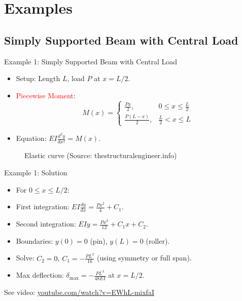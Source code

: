\documentclass{beamer}
\begin{document}
\section{Examples}
\subsection{Simply Supported Beam with Central Load}
\begin{frame}{Example 1: Simply Supported Beam with Central Load}
    \begin{itemize}
        \item Setup: Length \( L \), load \( P \) at \( x = L/2 \).
        \item \textcolor{red}{Piecewise Moment}:
        \[
        M(x) = \begin{cases} 
        \frac{Px}{2}, & 0 \leq x \leq \frac{L}{2} \\
        \frac{P(L-x)}{2}, & \frac{L}{2} < x \leq L 
        \end{cases}
        \]
        \item Equation: \( EI \frac{d^2y}{dx^2} = M(x) \).
    \end{itemize}
    \begin{figure}
        \centering
        \caption{Elastic curve (Source: thestructuralengineer.info)}
    \end{figure}
\end{frame}

\begin{frame}{Example 1: Solution}
    \begin{itemize}
        \item For \( 0 \leq x \leq L/2 \):
        \item First integration: \( EI \frac{dy}{dx} = \frac{Px^2}{4} + C_1 \).
        \item Second integration: \( EI y = \frac{Px^3}{12} + C_1 x + C_2 \).
        \item Boundaries: \( y(0) = 0 \) (pin), \( y(L) = 0 \) (roller).
        \item Solve: \( C_2 = 0 \), \( C_1 = -\frac{PL^2}{16} \) (using symmetry or full span).
        \item Max deflection: \( \delta_{\text{max}} = -\frac{PL^3}{48EI} \) at \( x = L/2 \).
    \end{itemize}
    See video: \href{https://www.youtube.com/watch?v=EWhL-mixfaI}{youtube.com/watch?v=EWhL-mixfaI}
\end{frame}
\end{document}
